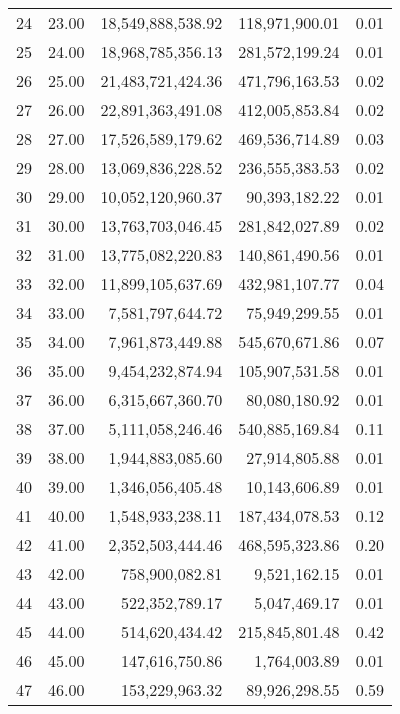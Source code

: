 \begin{table}[ht]
\begin{tabular}{rrrrr}
  24 & 23.00 & 18,549,888,538.92 & 118,971,900.01 & 0.01 \\ 
  25 & 24.00 & 18,968,785,356.13 & 281,572,199.24 & 0.01 \\ 
  26 & 25.00 & 21,483,721,424.36 & 471,796,163.53 & 0.02 \\ 
  27 & 26.00 & 22,891,363,491.08 & 412,005,853.84 & 0.02 \\ 
  28 & 27.00 & 17,526,589,179.62 & 469,536,714.89 & 0.03 \\ 
  29 & 28.00 & 13,069,836,228.52 & 236,555,383.53 & 0.02 \\ 
  30 & 29.00 & 10,052,120,960.37 & 90,393,182.22 & 0.01 \\ 
  31 & 30.00 & 13,763,703,046.45 & 281,842,027.89 & 0.02 \\ 
  32 & 31.00 & 13,775,082,220.83 & 140,861,490.56 & 0.01 \\ 
  33 & 32.00 & 11,899,105,637.69 & 432,981,107.77 & 0.04 \\ 
  34 & 33.00 & 7,581,797,644.72 & 75,949,299.55 & 0.01 \\ 
  35 & 34.00 & 7,961,873,449.88 & 545,670,671.86 & 0.07 \\ 
  36 & 35.00 & 9,454,232,874.94 & 105,907,531.58 & 0.01 \\ 
  37 & 36.00 & 6,315,667,360.70 & 80,080,180.92 & 0.01 \\ 
  38 & 37.00 & 5,111,058,246.46 & 540,885,169.84 & 0.11 \\ 
  39 & 38.00 & 1,944,883,085.60 & 27,914,805.88 & 0.01 \\ 
  40 & 39.00 & 1,346,056,405.48 & 10,143,606.89 & 0.01 \\ 
  41 & 40.00 & 1,548,933,238.11 & 187,434,078.53 & 0.12 \\ 
  42 & 41.00 & 2,352,503,444.46 & 468,595,323.86 & 0.20 \\ 
  43 & 42.00 & 758,900,082.81 & 9,521,162.15 & 0.01 \\ 
  44 & 43.00 & 522,352,789.17 & 5,047,469.17 & 0.01 \\ 
  45 & 44.00 & 514,620,434.42 & 215,845,801.48 & 0.42 \\ 
  46 & 45.00 & 147,616,750.86 & 1,764,003.89 & 0.01 \\ 
  47 & 46.00 & 153,229,963.32 & 89,926,298.55 & 0.59 \\ 
   \hline
\end{tabular}
\end{table}
